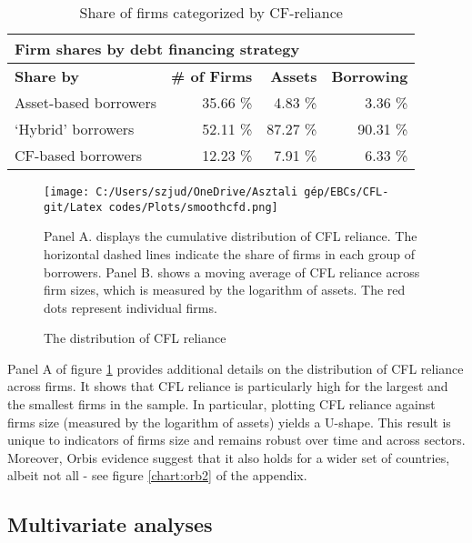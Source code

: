 \documentclass[12pt]{article}
\begin{document}
\begin{table}[h!]
    \centering
    \begin{tabular}{l|rrr}
    \multicolumn{4}{l}{\textbf{Firm shares by debt financing strategy}} \\
    \hline
    \hspace{2.2cm} \textbf{Share by} & \textbf{\# of Firms} & \textbf{Assets}  & \textbf{Borrowing} \\  
    Asset-based borrowers & 35.66 \% & 4.83 \% & 3.36 \% \\ 
    `Hybrid' borrowers & 52.11 \% & 87.27 \% & 90.31  \% \\ 
    CF-based borrowers & 12.23 \% & 7.91 \% & 6.33  \% \\ 
       \bottomrule
    \end{tabular}
    \caption{\small Share of firms categorized by CF-reliance} 
    \label{tab:shares}
    \end{table}

\begin{figure}[H]  %
    \centering
    \caption{The distribution of CFL reliance} \label{chart:CFLcdf}
    \texttt{[image: C:/Users/szjud/OneDrive/Asztali gép/EBCs/CFL-git/Latex codes/Plots/smoothcfd.png]}
     \begin{justify}
     \small Panel A. displays the cumulative distribution of CFL reliance. The horizontal dashed lines indicate the share of firms in each group of borrowers. Panel B. shows a moving average of CFL reliance across firm sizes, which is measured by the logarithm of assets. The red dots represent individual firms. 
    \end{justify}
\end{figure}

\noindent Panel A of figure \ref{chart:CFLcdf} provides additional details on the distribution of CFL reliance across firms. It shows that CFL reliance is particularly high for the largest and the smallest firms in the sample. In particular, plotting CFL reliance against firms size (measured by the logarithm of assets) yields a U-shape. This result is unique to indicators of firms size and remains robust over time and across sectors. Moreover, Orbis evidence suggest that it also holds for a wider set of countries, albeit not all - see figure \ref{chart:orb2} of the appendix. 

\subsection{Multivariate analyses \label{sec: multivariate analysis}}
\end{document}

